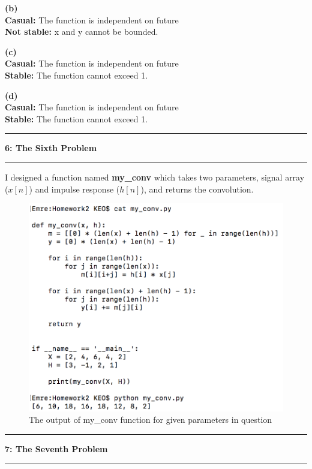 \documentclass[11pt]{article}
\newcommand\question[2]{\vspace{.25in}\hrule\textbf{#1: #2}\vspace{.5em}\hrule\vspace{.10in}}
\renewcommand\part[1]{\vspace{.10in}\textbf{(#1)}}
\newcommand\tab[1][1cm]{\hspace*{#1}}
\begin{document}
\part{b} \\
\tab \textbf{Casual:} The function is independent on future \\
\tab \textbf{Not stable:} x and y cannot be bounded.

\part{c} \\
\tab \textbf{Casual:} The function is independent on future \\
\tab \textbf{Stable:} The function cannot exceed 1.

\part{d} \\
\tab \textbf{Casual:} The function is independent on future \\
\tab \textbf{Stable:} The function cannot exceed 1.

\cleardoublepage

\question{6}{The Sixth Problem} 

I designed a function named \textbf{my\_conv} which takes two parameters, signal array ($x[n]$) and impulse response ($h[n]$), and returns the convolution.  

\begin{figure}[h]
	\centering
	\includegraphics[width=0.7\linewidth]{my_conv}
	\caption{The output of my\_conv function for given parameters in question}
	\label{fig:my_conv}
\end{figure}

\question{7}{The Seventh Problem} 
\end{document}
